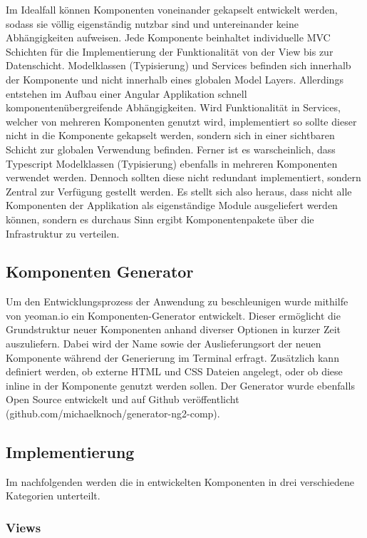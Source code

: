 Im Idealfall können Komponenten voneinander gekapselt entwickelt werden,
sodass sie völlig eigenständig nutzbar sind und untereinander keine Abhängigkeiten aufweisen.
Jede Komponente beinhaltet individuelle \ac{MVC} Schichten für die Implementierung der Funktionalität von der View bis zur Datenschicht.
Modelklassen (Typisierung) und Services befinden sich innerhalb der Komponente und nicht innerhalb eines globalen Model Layers.
Allerdings entstehen im Aufbau einer Angular Applikation schnell komponentenübergreifende Abhängigkeiten.
Wird Funktionalität in Services, welcher von mehreren Komponenten genutzt wird, implementiert
so sollte dieser nicht in die Komponente gekapselt werden, sondern sich in einer sichtbaren Schicht zur globalen Verwendung befinden.
Ferner ist es warscheinlich, dass Typescript Modelklassen (Typisierung) ebenfalls in mehreren Komponenten verwendet werden.
Dennoch sollten diese nicht redundant implementiert,
sondern Zentral zur Verfügung gestellt werden. Es stellt sich also heraus,
dass nicht alle Komponenten der Applikation \projectname{} als eigenständige Module ausgeliefert werden können,
sondern es durchaus Sinn ergibt Komponentenpakete über die Infrastruktur zu verteilen.


\subsection{Komponenten Generator}

Um den Entwicklungsprozess der Anwendung zu beschleunigen wurde mithilfe von yeoman.io ein Komponenten-Generator entwickelt.
Dieser ermöglicht die Grundstruktur neuer Komponenten anhand diverser Optionen in kurzer Zeit auszuliefern.
Dabei wird der Name sowie der Auslieferungsort der neuen Komponente während der Generierung im Terminal erfragt.
Zusätzlich kann definiert werden, ob externe \ac{HTML} und \ac{CSS} Dateien angelegt, oder ob diese inline in der Komponente genutzt werden sollen.
Der Generator wurde ebenfalls Open Source entwickelt und auf Github veröffentlicht
(github.com/michaelknoch/generator-ng2-comp).

\subsection{Implementierung}

Im nachfolgenden werden die in \projectname{} entwickelten Komponenten in drei verschiedene Kategorien unterteilt.

\subsubsection{Views}



